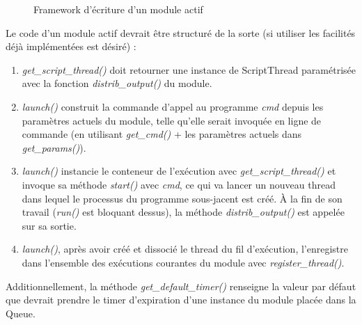 \documentclass[]{article}
\begin{document}
    \begin{figure}[!h]
       \noindent{}
       \caption{Framework d'écriture d'un module actif}
       \label{abstractif}
    \end{figure}

\vspace{0.3cm}

\par Le code d'un module actif devrait être structuré de la sorte (si utiliser les facilités déjà implémentées est désiré) :

\begin{enumerate}
\item \textit{get\_script\_thread()} doit retourner une instance de ScriptThread paramétrisée avec la fonction \textit{distrib\_output()} du module.
\vspace{0.1cm}
\item \textit{launch()} construit la commande d'appel au programme \textit{cmd} depuis les paramètres actuels du module, telle qu'elle serait invoquée en ligne de commande (en utilisant \textit{get\_cmd()} + les paramètres actuels dans \textit{get\_params()}).
\vspace{0.01cm}
\item \textit{launch()} instancie le conteneur de l'exécution avec \textit{get\_script\_thread()} et invoque sa méthode \textit{start()} avec \textit{cmd}, ce qui va lancer un nouveau thread dans lequel le processus du programme sous-jacent est créé. À la fin de son travail (\textit{run()} est bloquant dessus), la méthode \textit{distrib\_output()} est appelée sur sa sortie.
\vspace{0.1cm}
\item \textit{launch()}, après avoir créé et dissocié le thread du fil d'exécution, l'enregistre dans l'ensemble des exécutions courantes du module avec \textit{register\_thread()}.

\end{enumerate}
\vspace{0.2cm}
Additionnellement, la méthode \textit{get\_default\_timer()} renseigne la valeur par défaut que devrait prendre le timer d'expiration d'une instance du module placée dans la Queue.
\end{document}
